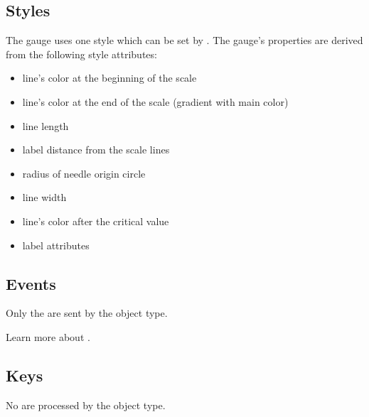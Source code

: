 \documentclass[letterpaper,10pt,english]{sphinxmanual}
\begin{document}
\subsection{Styles}
\label{\detokenize{object-types/gauge:styles}}
The gauge uses one style which can be set by . The gauge’s properties are derived from the following style attributes:
\begin{itemize}
\item {} 
 line’s color at the beginning of the scale

\item {} 
 line’s color at the end of the scale (gradient with main color)

\item {} 
 line length

\item {} 
 label distance from the scale lines

\item {} 
 radius of needle origin circle

\item {} 
 line width

\item {} 
 line’s color after the critical value

\item {} 
 label attributes

\end{itemize}


\subsection{Events}
\label{\detokenize{object-types/gauge:events}}
Only the  are sent by the object type.

Learn more about {\hyperref[\detokenize{overview/events::doc}]{}}.


\subsection{Keys}
\label{\detokenize{object-types/gauge:keys}}
No  are processed by the object type.
\end{document}

